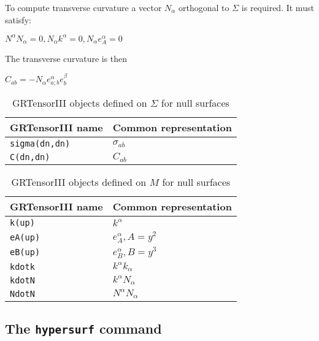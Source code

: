 \documentclass{article}
\begin{document}
To compute transverse curvature a vector $N_\alpha$ orthogonal to $\Sigma$ is required. It must satisfy:
\begin{center}
$N^\alpha N_\alpha = 0, N_\alpha k^\alpha = 0, N_\alpha e^\alpha_A = 0$
\end{center}
The transverse curvature is then 
\begin{center}
$C_{ab} = - N_\alpha e^\alpha_{a;b} e^\beta_b$
\end{center}

\renewcommand{\arraystretch}{1.5}
\begin{table}[h]
  \begin{center}
    \begin{tabular}{ll}\hline\hline
      \textbf{GRTensorIII name} & \textbf{Common representation}\\ \hline
      \texttt{sigma(dn,dn)}        & $\sigma_{ab} $  \\
      \texttt{C(dn,dn)}        & $C_{ab} $  \\
    \end{tabular}
    \caption{GRTensorIII objects defined on $\Sigma$ for null surfaces}
    \label{tab:null1}
  \end{center}
\end{table}

\begin{table}[ht]
  \begin{center}
    \begin{tabular}{ll}\hline\hline
      \textbf{GRTensorIII name} & \textbf{Common representation}\\ \hline
      \texttt{k(up)}        & $k^\alpha$  \\
      \texttt{eA(up)}        & $e^\alpha_{A}, A=y^2 $  \\
      \texttt{eB(up)}        & $e^\alpha_{B}, B=y^3 $  \\
      \texttt{kdotk}        & $k^\alpha k_\alpha$  \\
      \texttt{kdotN}        & $k^\alpha N_\alpha$  \\
      \texttt{NdotN}        & $N^\alpha N_\alpha$  \\
    \end{tabular}
    \caption{GRTensorIII objects defined on $M$ for null surfaces}
    \label{tab:null1}
  \end{center}
\end{table}


\FloatBarrier
\subsection{The \texttt{hypersurf} command}
\end{document}

